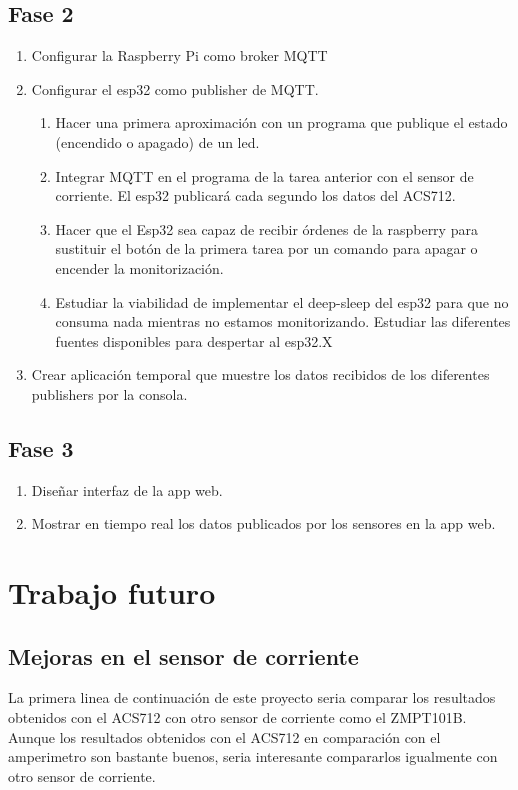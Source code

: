 \begin{titlepage}
\subsection{Fase 2}
\begin{enumerate}
    \item Configurar la Raspberry Pi como broker MQTT
    \item Configurar el esp32 como publisher de MQTT.
    \begin{enumerate}
        \item Hacer una primera aproximación con un programa que publique el estado (encendido o apagado) de un led. \checkmark
        \item Integrar MQTT en el programa de la tarea anterior con el sensor de corriente. El esp32 publicará cada segundo los datos del ACS712. \checkmark
        \item Hacer que el Esp32 sea capaz de recibir órdenes de la raspberry para sustituir el botón de la primera tarea por un comando para apagar o encender la monitorización. \checkmark
        \item Estudiar la viabilidad de implementar el deep-sleep del esp32 para que no consuma nada mientras no estamos monitorizando. Estudiar las diferentes fuentes disponibles para despertar al esp32.X
    \end{enumerate}
    \item Crear aplicación temporal que muestre los datos recibidos de los diferentes publishers por la consola. \checkmark
\end{enumerate}


\subsection{Fase 3}
\begin{enumerate}
    \item Diseñar interfaz de la app web. \checkmark
    \item Mostrar en tiempo real los datos publicados por los sensores en la app web. \checkmark
\end{enumerate}


\section{Trabajo futuro}
\subsection{Mejoras en el sensor de corriente}
La primera linea de continuación de este proyecto seria comparar los resultados obtenidos con el ACS712 con otro sensor de corriente como el ZMPT101B. Aunque los resultados obtenidos con el ACS712 en comparación con el amperimetro son bastante buenos, seria interesante compararlos igualmente con otro sensor de corriente.\\


\end{titlepage}
